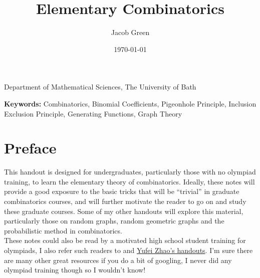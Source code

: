 \documentclass{article}
\title{Elementary Combinatorics}
\author{Jacob Green}
\date{\today}
\newcommand{\subtitle}{}
\newcommand{\institution}{Department of Mathematical Sciences, The University of Bath}
\newcommand{\keywords}{Combinatorics, Binomial Coefficients, Pigeonhole Principle, Inclusion Exclusion Principle, 
Generating Functions, Graph Theory}
\begin{document}
\begin{titlepage}
    \centering
    
    {\Huge \bfseries \thetitle \par}
    \vspace{0.5cm}
    
    {\Large \subtitle \par}
    \vspace{1cm}
    
    {\large \theauthor \par}
    {\institution \par}
    \vspace{1cm}
    
    {\large \thedate \par}
    \vspace{1.5cm}
    
    \begin{abstract}
        \lipsum[10]
    \end{abstract}
    \vspace{1cm}
    
    \textbf{Keywords:} \keywords
    \vfill %
    
    \textit{}
\end{titlepage}

\newpage 

\setcounter{page}{1} %

\section*{Preface}

This handout is designed for undergraduates, particularly those with no olympiad training, to learn the elementary theory 
of combinatorics. Ideally, these notes will provide a good exposure to the basic tricks that will be ``trivial'' 
in graduate combinatorics courses, and will further motivate the reader to go on and study these graduate courses. 
Some of my other handouts will explore this material, particularly those on random graphs, random geometric graphs 
and the probabilistic method in combinatorics. \\

These notes could also be read by a motivated high school student training for olympiads, I also refer such readers 
to \cite{di2014problem} and \hyperlink{https://yufeizhao.com/olympiad/}{Yufei Zhao's handouts}. I'm sure there are 
many other great resources if you do a bit of googling, I never did any olympiad training though so I wouldn't know! 
\end{document}
